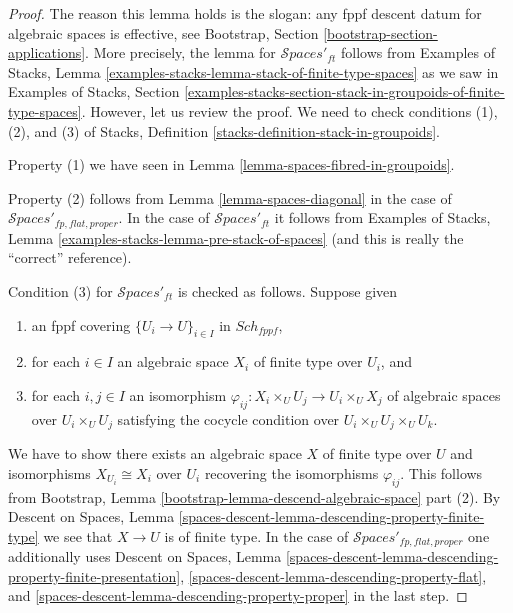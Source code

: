 \documentclass{stacks-project}
\theoremstyle{plain}
\theoremstyle{definition}
\theoremstyle{remark}
\numberwithin{equation}{subsection}
\def\Sch{\mathit{Sch}}
\def\Spacesstack{\mathcal{S}\!\mathit{paces}}
\begin{document}
\begin{proof}
The reason this lemma holds is the slogan: any fppf descent datum for algebraic
spaces is effective, see Bootstrap, Section
\ref{bootstrap-section-applications}.
More precisely, the lemma for $\Spacesstack'_{ft}$ follows from
Examples of Stacks, Lemma
\ref{examples-stacks-lemma-stack-of-finite-type-spaces}
as we saw in Examples of Stacks, Section
\ref{examples-stacks-section-stack-in-groupoids-of-finite-type-spaces}.
However, let us review the proof. We need to check conditions
(1), (2), and (3) of Stacks, Definition
\ref{stacks-definition-stack-in-groupoids}.

\medskip\noindent
Property (1) we have seen in Lemma \ref{lemma-spaces-fibred-in-groupoids}.

\medskip\noindent
Property (2) follows from
Lemma \ref{lemma-spaces-diagonal} in the case of
$\Spacesstack'_{fp, flat, proper}$.
In the case of $\Spacesstack'_{ft}$ it follows
from Examples of Stacks, Lemma
\ref{examples-stacks-lemma-pre-stack-of-spaces}
(and this is really the ``correct'' reference).

\medskip\noindent
Condition (3) for $\Spacesstack'_{ft}$ is checked as follows. Suppose given
\begin{enumerate}
\item an fppf covering $\{U_i \to U\}_{i \in I}$ in $\Sch_{fppf}$,
\item for each $i \in I$ an algebraic space $X_i$ of finite type over
$U_i$, and
\item for each $i, j \in I$ an isomorphism
$\varphi_{ij} : X_i \times_U U_j \to U_i \times_U X_j$ of algebraic spaces
over $U_i \times_U U_j$ satisfying the cocycle condition over
$U_i \times_U U_j \times_U U_k$.
\end{enumerate}
We have to show there exists an algebraic space $X$ of finite type over $U$
and isomorphisms $X_{U_i} \cong X_i$ over $U_i$ recovering the
isomorphisms $\varphi_{ij}$. This follows from
Bootstrap, Lemma \ref{bootstrap-lemma-descend-algebraic-space} part (2).
By Descent on Spaces, Lemma
\ref{spaces-descent-lemma-descending-property-finite-type}
we see that $X \to U$ is of finite type.
In the case of $\Spacesstack'_{fp, flat, proper}$
one additionally uses
Descent on Spaces, Lemma
\ref{spaces-descent-lemma-descending-property-finite-presentation},
\ref{spaces-descent-lemma-descending-property-flat}, and
\ref{spaces-descent-lemma-descending-property-proper}
in the last step.
\end{proof}
\end{document}
